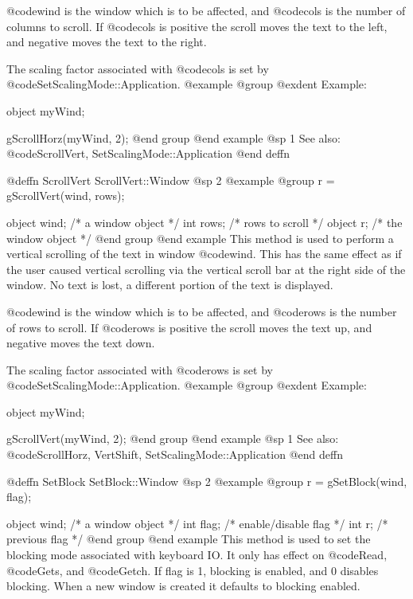 @code{wind} is the window which is to be affected, and @code{cols} is the
number of columns to scroll.  If @code{cols} is positive the scroll moves
the text to the left, and negative moves the text to the right.

The scaling factor associated with @code{cols} is set by
@code{SetScalingMode::Application}.
@example
@group
@exdent Example:

object  myWind;

gScrollHorz(myWind, 2);
@end group
@end example
@sp 1
See also:  @code{ScrollVert, SetScalingMode::Application}
@end deffn











@deffn {ScrollVert} ScrollVert::Window
@sp 2
@example
@group
r = gScrollVert(wind, rows);

object  wind;   /*  a window object     */
int     rows;   /*  rows to scroll      */
object  r;      /*  the window object   */
@end group
@end example
This method is used to perform a vertical scrolling of the text in
window @code{wind}.  This has the same effect as if the user caused
vertical scrolling via the vertical scroll bar at the right side
of the window.  No text is lost, a different portion of the text is
displayed.

@code{wind} is the window which is to be affected, and @code{rows} is the
number of rows to scroll.  If @code{rows} is positive the scroll moves
the text up, and negative moves the text down.

The scaling factor associated with @code{rows} is set by
@code{SetScalingMode::Application}.
@example
@group
@exdent Example:

object  myWind;

gScrollVert(myWind, 2);
@end group
@end example
@sp 1
See also:  @code{ScrollHorz, VertShift, SetScalingMode::Application}
@end deffn










@deffn {SetBlock} SetBlock::Window
@sp 2
@example
@group
r = gSetBlock(wind, flag);

object  wind;   /*  a window object     */
int     flag;   /*  enable/disable flag */
int     r;      /*  previous flag       */
@end group
@end example
This method is used to set the blocking mode associated with keyboard
IO.  It only has effect on @code{Read}, @code{Gets}, and @code{Getch}.
If flag is 1, blocking is enabled, and 0 disables blocking.  When a
new window is created it defaults to blocking enabled.

